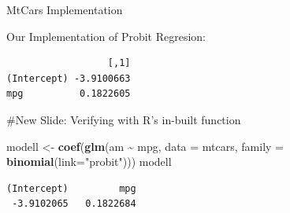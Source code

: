 \documentclass[
  ignorenonframetext,
]{beamer}
\newenvironment{Shaded}{\begin{snugshade}}{\end{snugshade}}
\newcommand{\AttributeTok}[1]{\textcolor[rgb]{0.13,0.29,0.53}{#1}}
\newcommand{\ConstantTok}[1]{\textcolor[rgb]{0.56,0.35,0.01}{#1}}
\newcommand{\ControlFlowTok}[1]{\textcolor[rgb]{0.13,0.29,0.53}{\textbf{#1}}}
\newcommand{\DecValTok}[1]{\textcolor[rgb]{0.00,0.00,0.81}{#1}}
\newcommand{\FloatTok}[1]{\textcolor[rgb]{0.00,0.00,0.81}{#1}}
\newcommand{\FunctionTok}[1]{\textcolor[rgb]{0.13,0.29,0.53}{\textbf{#1}}}
\newcommand{\NormalTok}[1]{#1}
\newcommand{\OtherTok}[1]{\textcolor[rgb]{0.56,0.35,0.01}{#1}}
\newcommand{\SpecialCharTok}[1]{\textcolor[rgb]{0.81,0.36,0.00}{\textbf{#1}}}
\newcommand{\StringTok}[1]{\textcolor[rgb]{0.31,0.60,0.02}{#1}}
\begin{document}
\begin{frame}[fragile]{MtCars Implementation}
\begin{block}{Our Implementation of Probit Regresion:}
\begin{Shaded}
\end{Shaded}

\begin{verbatim}
                  [,1]
(Intercept) -3.9100663
mpg          0.1822605
\end{verbatim}

\#New Slide: Verifying with R's in-built function

\begin{Shaded}
\begin{Highlighting}[]
\NormalTok{modell }\OtherTok{\textless{}{-}} \FunctionTok{coef}\NormalTok{(}\FunctionTok{glm}\NormalTok{(am }\SpecialCharTok{\textasciitilde{}}\NormalTok{ mpg, }\AttributeTok{data =}\NormalTok{ mtcars, }\AttributeTok{family =} \FunctionTok{binomial}\NormalTok{(}\AttributeTok{link=}\StringTok{"probit"}\NormalTok{)))}
\NormalTok{modell}
\end{Highlighting}
\end{Shaded}

\begin{verbatim}
(Intercept)         mpg 
 -3.9102065   0.1822684 
\end{verbatim}


\end{block}
\end{frame}
\end{document}
